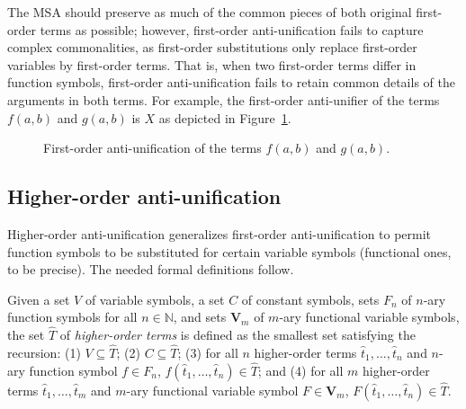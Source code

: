 The MSA should preserve as much of the common pieces of both original first-order terms as possible; however, first-order anti-unification fails to capture complex commonalities, as first-order substitutions only replace first-order variables by first-order terms. That is, when two first-order terms differ in function symbols, first-order anti-unification fails to retain common details of the arguments in both terms. For example, the first-order anti-unifier of the terms $f(a,b)$ and $g(a,b)$ is $X$ as depicted in Figure~\ref{fig:first-anti-uni}.

\begin{figure}[t]
\centering{}
\caption{First-order anti-unification of the terms $f(a,b)$ and $g(a,b)$.\label{fig:first-anti-uni}}
\end{figure}

\subsection{Higher-order anti-unification}

Higher-order anti-unification generalizes first-order anti-unification to permit function symbols to be substituted for certain variable symbols (functional ones, to be precise).  The needed formal definitions follow.

\begin{defn}\label{def:hterm}
Given a set $V$ of variable symbols, a set $C$ of constant symbols, sets $F_n$ of $n$-ary function symbols for all $n\in\mathbb{N}$, and sets $\mathbf{V}_m$ of $m$-ary functional variable symbols, the set $\hat{T}$ of \emph{higher-order terms} is defined as the smallest set satisfying the recursion: (1) $V\subseteq \hat{T}$; (2) $C\subseteq \hat{T}$; (3) for all $n$ higher-order terms $\hat{t}_1, \ldots, \hat{t}_n$ and $n$-ary function symbol $f\in F_n$,  $f(\hat{t}_1, \ldots, \hat{t}_n) \in \hat{T}$; and (4) for all $m$ higher-order terms $\hat{t}_1, \ldots, \hat{t}_m$ and $m$-ary functional variable symbol $F\in \mathbf{V}_m$,  $F(\hat{t}_1, \ldots, \hat{t}_n) \in \hat{T}$.
\end{defn}

